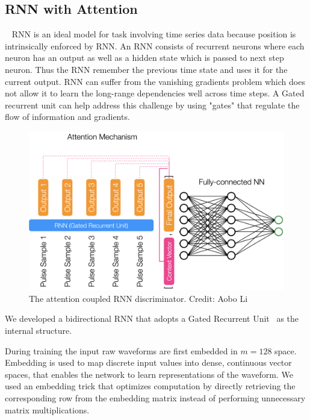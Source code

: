 \subsection{RNN with Attention}~\label{subapp:RNN}
RNN is an ideal model for task involving time series data because position is intrinsically enforced by RNN. \cite{Rumelhart1986} An RNN consists of recurrent neurons where each neuron has an output as well as a hidden state which is passed to next step neuron. Thus the RNN remember the previous time state and uses it for the current output. RNN can suffer from the vanishing gradients problem which does not allow it to learn the long-range dependencies well across time steps. A Gated recurrent unit can help address this challenge by using "gates" that regulate the flow of information and gradients. ~\cite{GRU}

\begin{figure}[htb!]
    \centering

    \includegraphics[width=0.7\linewidth,trim={0pc 0pc 0pc 0pc},clip]{ch6/figs/rnnAttention.png}
    \caption{The attention coupled RNN discriminator. Credit: Aobo Li}
    \label{ch6:fig:detail_network}
\end{figure}

We developed a bidirectional RNN that adopts a Gated Recurrent Unit~\cite{GRU} as the internal structure. 

During training the input raw waveforms are first embedded in $m=128$ space. Embedding is used to map discrete input values into dense, continuous vector spaces, that enables the network to learn representations of the waveform. We used an embedding trick that optimizes computation by directly retrieving the corresponding row from the embedding matrix instead of performing unnecessary matrix multiplications. 

